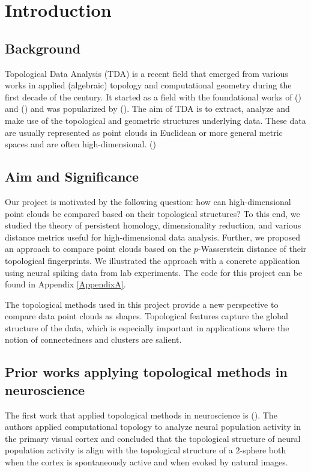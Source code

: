 \chapter{Introduction} 
\label{Chapter1-intro} 

\section{Background}
Topological Data Analysis (TDA) is a recent field that emerged from various works in applied (algebraic) topology and computational geometry during the first decade of the century. It started as a field with the foundational works of (\cite{edelsbrunner_topological_2002}) and (\cite{Zom2005a}) and was popularized by (\cite{carlsson_topology_2009}). The aim of TDA is to extract, analyze and make use of the topological and geometric structures underlying data. These data are usually represented as point clouds in Euclidean or more general metric spaces and are often high-dimensional. (\cite{chazal_introduction_2021})

\section{Aim and Significance}
Our project is motivated by the following question: how can high-dimensional point clouds be compared based on their topological structures? To this end, we studied the theory of persistent homology, dimensionality reduction, and various distance metrics useful for high-dimensional data analysis. Further, we proposed an approach to compare point clouds based on the $p$-Wasserstein distance of their topological fingerprints. We illustrated the approach with a concrete application using neural spiking data from lab experiments. The code for this project can be found in Appendix \ref{AppendixA}.

The topological methods used in this project provide a new perspective to compare data point clouds as shapes. Topological features capture the global structure of the data, which is especially important in applications where the notion of connectedness and clusters are salient.


\section{Prior works applying topological methods in neuroscience}

The first work that applied topological methods in neuroscience is (\cite{singh_top_v1_2008}). The authors applied computational topology to analyze neural population activity in the primary visual cortex and concluded that the topological structure of neural population activity is align with the topological structure of a $2$-sphere both when the cortex is spontaneously active and when evoked by natural images.

